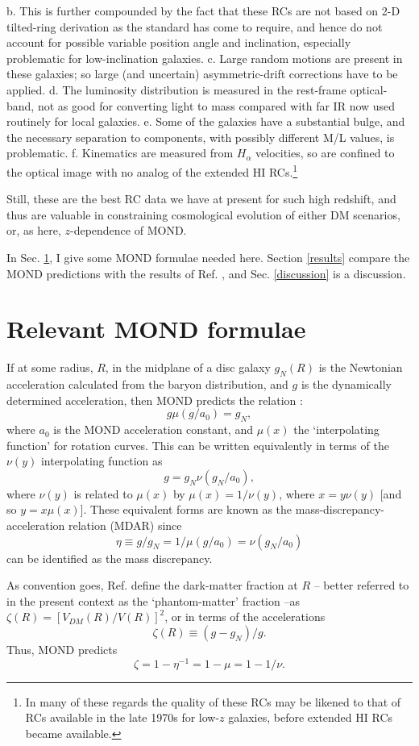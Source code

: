 \documentclass[twocolumn,showpacs,amsmath,amssymb,prd,nofootinbib]
{revtex4}
\def\sss{\scriptscriptstyle}
\def\_#1{_{\sss #1}}
\def\beq{\begin{equation}}
\def\eeqno#1{\label{#1}\end{equation}}
\def\az{a\_{0}}
\def\m{\mu}
\def\n{\nu}
\def\a{\alpha}
\def\gN{g\_N}
\begin{document}
b. This is further compounded by the fact that
these RCs are not based on 2-D tilted-ring derivation as the standard has come to require, and hence do not account for possible variable position angle and inclination, especially problematic for low-inclination galaxies.
c. Large random motions are present in these galaxies; so large (and uncertain) asymmetric-drift corrections have to be applied. d. The luminosity distribution is measured in the rest-frame optical-band, not as good for converting light to mass compared with far IR now used routinely for local galaxies. e. Some of the galaxies have a substantial bulge, and the necessary separation to components, with possibly different M/L values, is problematic.
f. Kinematics are measured from $H_\a$ velocities, so are confined to the optical image with no analog of the extended HI RCs.\footnote{In many of these regards the quality of these RCs may be likened to that of RCs available in the late 1970s for low-$z$ galaxies, before extended HI RCs became available.}
\par
Still, these are the best RC data we have at present for such high redshift, and thus are valuable in constraining cosmological evolution of either DM scenarios, or, as here, $z$-dependence of MOND.
\par
In Sec. \ref{MOND}, I give some MOND formulae needed here. Section \ref{results}
compare the MOND predictions with the results of Ref. \cite{genzel17},
and Sec. \ref{discussion} is a discussion.

\section{Relevant MOND formulae}
\label{MOND}
If at some radius, $R$, in the midplane of a disc galaxy $\gN(R)$ is the Newtonian acceleration calculated from the baryon distribution, and $g$ is the dynamically determined acceleration, then MOND predicts the relation \cite{milgrom83a}:
\beq g\m(g/\az)=\gN, \eeqno{mdarmu}
where $\az$ is the MOND acceleration constant, and $\m(x)$ the `interpolating function' for rotation curves.
This can be written equivalently in terms of the $\n(y)$ interpolating function
as
\beq g=\gN\n(\gN/\az), \eeqno{mdarnu}
where $\n(y)$ is related to $\m(x)$  by $\m(x)=1/\n(y)$, where $x=y\n(y)$ [and so $y=x\m(x)$].
These equivalent forms are known as the mass-discrepancy-acceleration relation (MDAR) since
\beq \eta\equiv g/\gN=1/\m(g/\az)=\n(\gN/\az) \eeqno{mdar}
can be identified as the mass discrepancy.
\par
As convention goes, Ref. \cite{genzel17} define the dark-matter fraction at $R$ -- better referred to in the present context as the `phantom-matter' fraction --as
$\zeta(R)=[V\_{DM}(R)/V(R)]^2$, or in terms of the accelerations
\beq \zeta(R)\equiv (g-\gN)/g. \eeqno{frac}
Thus, MOND predicts
\beq \zeta=1-\eta^{-1}=1-\m=1-1/\n.  \eeqno{etamu}
\end{document}
